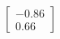 \documentclass[preview]{standalone}
\begin{document}
\begin{align*}
\begin{bmatrix} -0.86 \\ 0.66 \end{bmatrix}
\end{align*}
\end{document}
